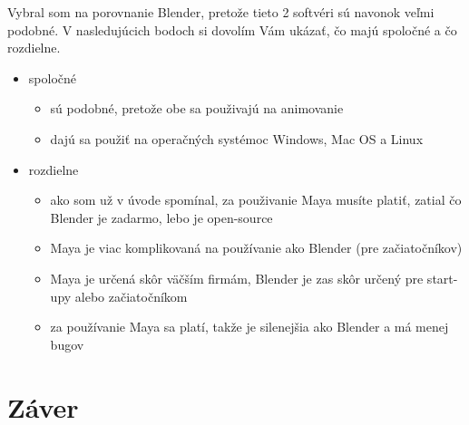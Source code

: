 \documentclass[10pt,oneside,slovak,a4paper]{article}
\begin{document}
Vybral som na porovnanie Blender, pretože tieto 2 softvéri sú navonok veľmi podobné. V nasledujúcich bodoch si dovolím Vám ukázať, čo majú spoločné a čo rozdielne.

\begin{itemize}
\item spoločné
	\begin{itemize}
	\item sú podobné, pretože obe sa použivajú na animovanie
	\item dajú sa použiť na operačných systémoc Windows, Mac OS a Linux
	\end{itemize}

\item rozdielne
	\begin{itemize}
	\item ako som už v úvode spomínal, za použivanie Maya musíte platiť, zatial čo Blender je zadarmo, lebo je open-source
	\item Maya je viac komplikovaná na používanie ako Blender (pre začiatočníkov)
	\item Maya je určená skôr väčším firmám, Blender je zas skôr určený pre start-upy alebo začiatočníkom
	\item za používanie Maya sa platí, takže je silenejšia ako Blender a má menej bugov\cite{educba2021}
	\end{itemize}
\end{itemize}

\section{Záver} \label{zaver} %






\end{document}
